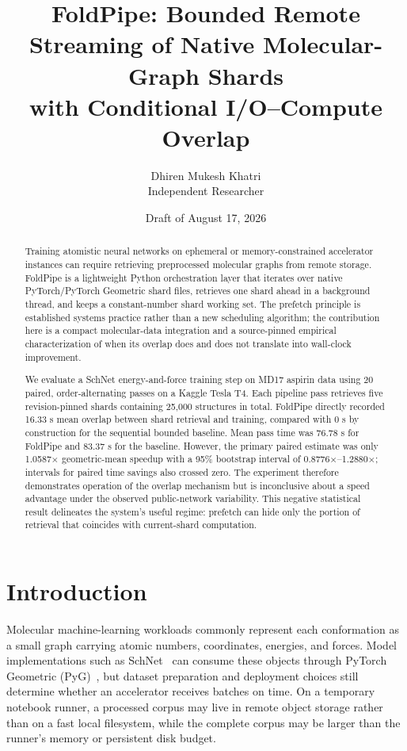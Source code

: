 \documentclass[10pt]{article}
\title{FoldPipe: Bounded Remote Streaming of Native Molecular-Graph Shards\\
with Conditional I/O--Compute Overlap}
\author{Dhiren Mukesh Khatri\\
\small Independent Researcher}
\date{Draft of August 17, 2026}
\begin{document}
\maketitle

\begin{abstract}
Training atomistic neural networks on ephemeral or memory-constrained
accelerator instances can require retrieving preprocessed molecular graphs from
remote storage.  FoldPipe is a lightweight Python orchestration layer that
iterates over native PyTorch/PyTorch Geometric shard files, retrieves one shard
ahead in a background thread, and keeps a constant-number shard working set.
The prefetch principle is established systems practice rather than a new
scheduling algorithm; the contribution here is a compact molecular-data
integration and a source-pinned empirical characterization of when its overlap
does and does not translate into wall-clock improvement.

We evaluate a SchNet energy-and-force training step on MD17 aspirin data using
20 paired, order-alternating passes on a Kaggle Tesla T4.  Each pipeline pass
retrieves five revision-pinned shards containing 25,000 structures in total.
FoldPipe directly recorded 16.33 s mean overlap between shard retrieval and
training, compared with 0 s by construction for the sequential bounded
baseline.  Mean pass time was 76.78 s for FoldPipe and 83.37 s for the
baseline.  However, the primary paired estimate was only 1.0587$\times$
geometric-mean speedup with a 95\% bootstrap interval of
0.8776$\times$--1.2880$\times$; intervals for paired time savings also crossed
zero.  The experiment therefore demonstrates operation of the overlap
mechanism but is inconclusive about a speed advantage under the observed
public-network variability.  This negative statistical result delineates the
system's useful regime: prefetch can hide only the portion of retrieval that
coincides with current-shard computation.
\end{abstract}

\section{Introduction}

Molecular machine-learning workloads commonly represent each conformation as a
small graph carrying atomic numbers, coordinates, energies, and forces.  Model
implementations such as SchNet~\cite{schutt2018schnet} can consume these objects
through PyTorch Geometric (PyG)~\cite{fey2019pyg}, but dataset preparation and
deployment choices still determine whether an accelerator receives batches on
time.  On a temporary notebook runner, a processed corpus may live in remote
object storage rather than on a fast local filesystem, while the complete
corpus may be larger than the runner's memory or persistent disk budget.
\end{document}

